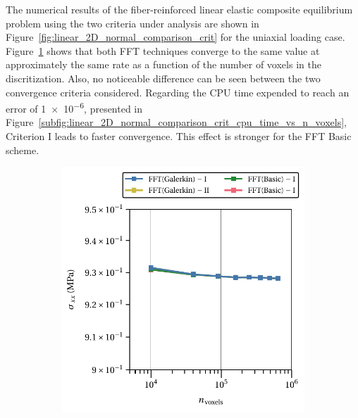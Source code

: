 The numerical results of the fiber-reinforced linear elastic composite equilibrium problem using the two criteria under analysis are shown in Figure~\ref{fig:linear_2D_normal_comparison_crit} for the uniaxial loading case.
Figure~\ref{subfig:linear_2D_normal_comparison_crit_homo_stress_11_vs_n_voxels} shows that both FFT techniques converge to the same value at approximately the same rate as a function of the number of voxels in the discritization.
Also, no noticeable difference can be seen between the two convergence criteria considered.
Regarding the CPU time expended to reach an error of \num{1e-6}, presented in Figure~\ref{subfig:linear_2D_normal_comparison_crit_cpu_time_vs_n_voxels}, Criterion I leads to faster convergence.
This effect is stronger for the FFT Basic scheme.

\begin{figure}[hbt]
\centering
	\begin{subfigure}[b]{0.51\textwidth}
    \centering
    \includegraphics[width=\textwidth]{figures/linear_2D_normal_comparison_crit_homo_stress_11_vs_n_voxels}
    \caption{}
    \label{subfig:linear_2D_normal_comparison_crit_homo_stress_11_vs_n_voxels}
  \end{subfigure}
  \begin{subfigure}[b]{0.48\textwidth}
    \centering

\end{subfigure}
\end{figure}
